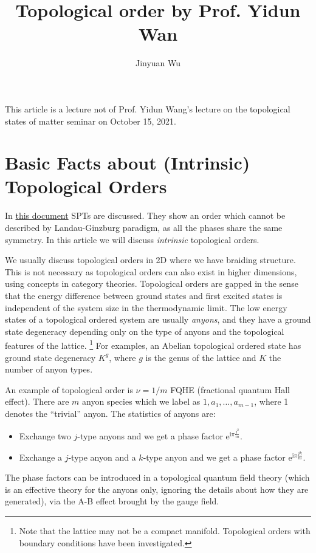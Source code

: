 \documentclass[hyperref, a4paper]{article}
\title{Topological order by Prof. Yidun Wan}
\author{Jinyuan Wu}
\newcommand*{\ii}{\mathrm{i}}
\newcommand*{\ee}{\mathrm{e}}
\begin{document}
This article is a lecture not of Prof. Yidun Wang's lecture on the topological states of matter seminar on October 15, 2021.

\maketitle

\section{Basic Facts about (Intrinsic) Topological Orders}

In \href{./2021-10-8}{this document} SPTs are discussed. 
They show an order which cannot be described by Landau-Ginzburg paradigm, as all the phases share the same symmetry. 
In this article we will discuss \emph{intrinsic} topological orders.

We usually discuss topological orders in 2D where we have braiding structure. 
This is not necessary as topological orders can also exist in higher dimensions, using concepts in category theories.
Topological orders are gapped in the sense that the energy difference between ground states and first excited states is independent of the system size in the thermodynamic limit.
The low energy states of a topological ordered system are usually \emph{anyons}, 
and they have a ground state degeneracy depending only on the type of anyons and the topological features of the lattice.%
\footnote{
    Note that the lattice may not be a compact manifold. Topological orders with boundary conditions have been investigated.
}%
For examples, an Abelian topological ordered state has ground state degeneracy $K^g$, where $g$ is the genus of the lattice and $K$ the number of anyon types.

An example of topological order is $\nu = 1 / m$ FQHE (fractional quantum Hall effect). There are $m$ anyon species which we label as $1, a_1, \ldots, a_{m-1}$, where 1 denotes the ``trivial'' anyon.
The statistics of anyons are:
\begin{itemize}
    \item Exchange two $j$-type anyons and we get a phase factor $\ee^{\ii \pi \frac{j^2}{m}}$.
    \item Exchange a $j$-type anyon and a $k$-type anyon and we get a phase factor $\ee^{\ii \pi \frac{jk}{m}}$.
\end{itemize}
The phase factors can be introduced in a topological quantum field theory (which is an effective theory for the anyons only, ignoring the details about how they are generated), via the A-B effect brought by the gauge field.
\end{document}
